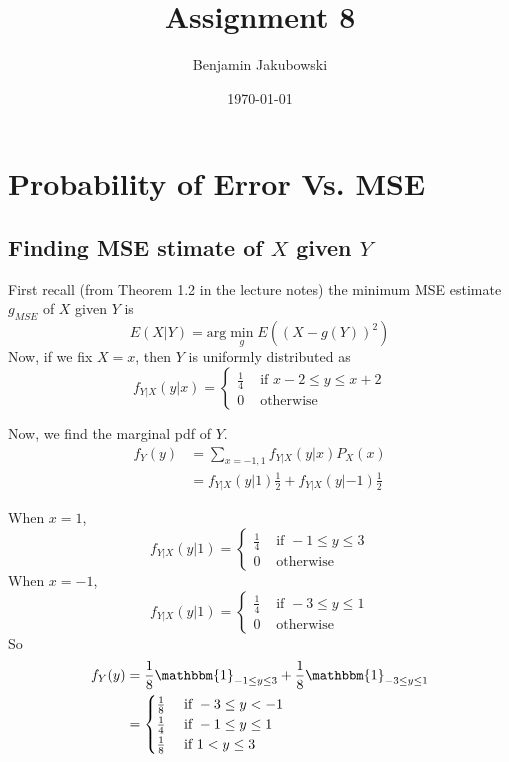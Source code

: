 \documentclass[paper=a4, fontsize=11pt]{scrartcl} %
\title{	Assignment 8}
\author{Benjamin Jakubowski} %
\date{\normalsize\today} %
\numberwithin{equation}{section} %
\numberwithin{figure}{section} %
\numberwithin{table}{section} %
\begin{document}
\maketitle %


\section{Probability of Error Vs. MSE}

\subsection{Finding MSE stimate of $X$ given $Y$}

First recall (from Theorem 1.2 in the lecture notes) the minimum MSE estimate $g_{MSE}$ of $X$ given $Y$ is
\[E(X | Y) = \textrm{arg} \min_g E\left( (X - g(Y))^2 \right)\]
Now, if we fix $X=x$, then $Y$ is uniformly distributed as
\[
f_{Y|X}(y|x) =
\begin{cases}
   \frac{1}{4} & \textrm{ if } x-2 \leq y \leq x+2 \\
   0 & \textrm{ otherwise}   
\end{cases}
\]

Now, we find the marginal pdf of $Y$.
\begin{align*}
f_Y(y) &= \sum_{x = -1, 1} f_{Y|X} (y | x) P_X(x) \\
   &= f_{Y|X} (y | 1) \frac{1}{2} + f_{Y|X} (y | -1) \frac{1}{2}
\end{align*}

When $x = 1$,
\[
f_{Y|X}(y | 1) =
\begin{cases}
\frac{1}{4} & \textrm{ if } -1 \leq y \leq 3 \\
   0 & \textrm{ otherwise}
\end{cases}
\]
When $x = -1$,
\[
f_{Y|X}(y | 1) =
\begin{cases}
\frac{1}{4} & \textrm{ if } -3 \leq y \leq 1 \\
   0 & \textrm{ otherwise}
\end{cases}
\]
So
\begin{align*}
f_Y(y) &= \frac{1}{8} \mathbbm{1}_{-1 \leq y \leq 3} + \frac{1}{8} \mathbbm{1}_{-3 \leq y \leq 1}\\
   &=
   \begin{cases}
   \frac{1}{8} & \textrm{ if } -3 \leq y < -1 \\
   \frac{1}{4} & \textrm{ if } -1 \leq y \leq 1 \\
   \frac{1}{8} & \textrm{ if } 1 < y \leq 3
   \end{cases}
\end{align*}
\end{document}
